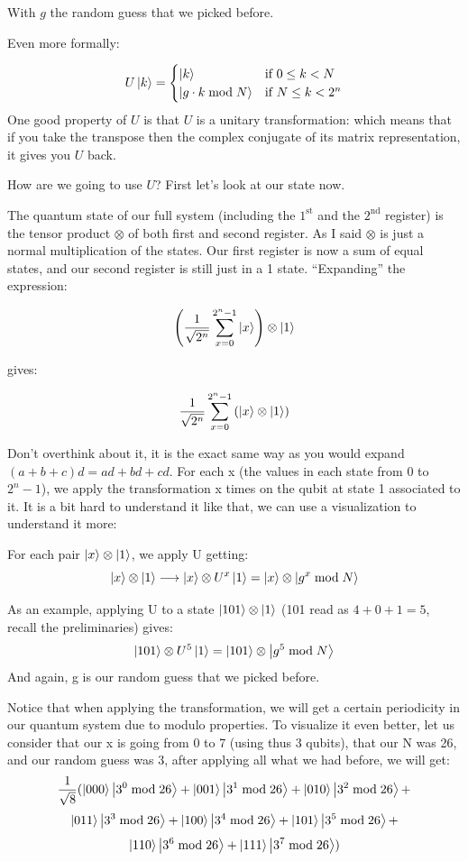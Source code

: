With $g$ the random guess that we picked before.

Even more formally:

$$
U\ket{k} =
\begin{cases}
\ket{k} & \text{if } 0 \leq k < N \\
\ket{g \cdot k \bmod N} & \text{if } N \leq k < 2^n
\end{cases}
$$
One good property of $U$ is that $U$ is a unitary transformation: which means that if you take the transpose then the complex conjugate of its matrix representation, it gives you $U$ back.



How are we going to use $U$? First let’s look at our state now.



The quantum state of our full system (including the $1^\text{st}$ and the $2^\text{nd}$ register) is the tensor product $\otimes$ of both first and second register. As I said $\otimes$ is just a normal multiplication of the states. Our first register is now a sum of equal states, and our second register is still just in a 1 state. “Expanding” the expression:

\[
\left( \frac{1}{\sqrt{2^n}} \sum_{x=0}^{2^n - 1} \ket{x} \right) \otimes \ket{1}
\]

gives:

\[
\frac{1}{\sqrt{2^n}} \sum_{x=0}^{2^n - 1} \left( \ket{x} \otimes \ket{1} \right)
\]

Don’t overthink about it, it is the exact same way as you would expand $(a + b + c)d = ad + bd + cd $.
For each x (the values in each state from 0 to $2^n - 1$), we apply the transformation x times on the qubit at state 1 associated to it. It is a bit hard to understand it like that, we can use a visualization to understand it more:

For each pair $\ket{x} \otimes \ket{1}$, we apply U getting:
$$
\ket{x} \otimes \ket{1} \longrightarrow \ket{x} \otimes U^x \ket{1} = \ket{x} \otimes \ket{g^x \bmod N}
$$

As an example, applying U to a state $\ket{101} \otimes \ket{1}$ (101 read as $4 + 0 + 1 = 5$, recall the preliminaries) gives: 
$$
\ket{101} \otimes U^5 \ket{1} = \ket{101} \otimes \ket{g^5 \bmod N}
$$
And again, g is our random guess that we picked before.

Notice that when applying the transformation, we will get a certain periodicity in our quantum system due to modulo properties. To visualize it even better, let us consider that our x is going from 0 to 7 (using thus 3 qubits), that our N was 26, and our random guess was 3, after applying all what we had before, we will get:
$$
\frac{1}{\sqrt{8}} (\ket{000} \ket{3^0 \bmod 26} + \ket{001} \ket{3^1 \bmod 26} + \ket{010} \ket{3^2 \bmod 26} +
$$
$$
\ket{011} \ket{3^3 \bmod 26} + \ket{100} \ket{3^4 \bmod 26} + \ket{101} \ket{3^5 \bmod 26} +
$$
$$
\ket{110} \ket{3^6 \bmod 26} + \ket{111} \ket{3^7 \bmod 26})
$$

